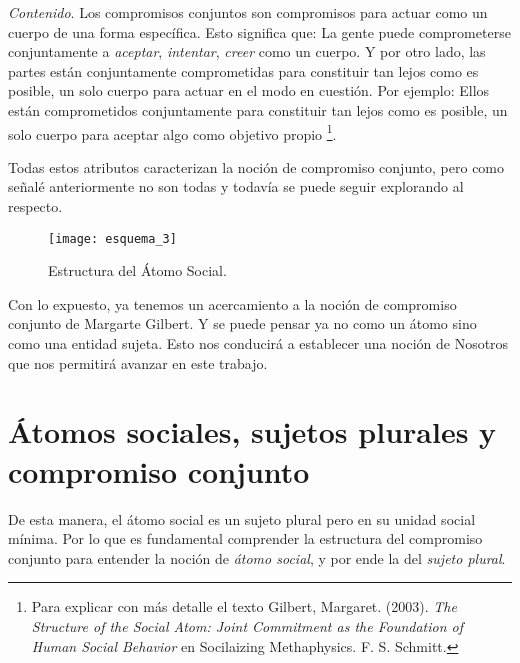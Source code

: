 \documentclass[oneside]{book}
\begin{document}
\textit{Contenido}. Los compromisos conjuntos son compromisos para actuar como un cuerpo de una forma específica. Esto significa que: La gente puede comprometerse conjuntamente a \textit{aceptar}, \textit{intentar}, \textit{creer} como un cuerpo. Y por otro lado, las partes están conjuntamente comprometidas para constituir tan lejos como es posible, un solo cuerpo para actuar en el modo en cuestión. Por ejemplo: Ellos están comprometidos conjuntamente para constituir tan lejos como es posible, un solo cuerpo para aceptar algo como objetivo propio \footnote{Para explicar con más detalle el texto Gilbert, Margaret. (2003). \textit{The Structure of the Social Atom: Joint Commitment as the Foundation of Human Social Behavior} en Socilaizing Methaphysics. F. S. Schmitt.}.

Todas estos atributos caracterizan la noción de compromiso conjunto, pero como señalé anteriormente no son todas y todavía se puede seguir explorando al respecto.

\begin{figure}[h]
	\centering
	\texttt{[image: esquema\_3]}
	\caption{Estructura del Átomo Social.}
\end{figure}

Con lo expuesto, ya tenemos un acercamiento a la noción de compromiso conjunto de Margarte Gilbert. Y se puede pensar ya no como un átomo sino como una entidad sujeta. Esto nos conducirá a establecer una noción de Nosotros que nos permitirá avanzar en este trabajo.

\section{Átomos sociales, sujetos plurales y compromiso conjunto}


De esta manera, el átomo social es un sujeto plural pero en su unidad social mínima. Por lo que es fundamental comprender la estructura del compromiso conjunto para entender la noción de \textit{átomo social}, y por ende la del \textit{sujeto plural}.
\end{document}
